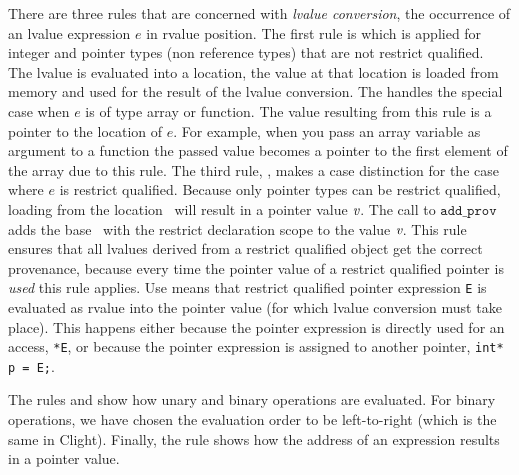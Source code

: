 There are three rules that are concerned with \textit{lvalue conversion}, the occurrence of an lvalue expression $e$
in rvalue position.
The first rule is  which is applied for integer and pointer types (\ie non reference types) that are not restrict qualified.
The lvalue is evaluated into a location, the value at that location is loaded from memory and used for the result of the lvalue conversion. 
The  handles the special case when $e$ is of type array or function.
The value resulting from this rule is a pointer to the location of $e$.
For example, when you pass an array variable as argument to a function the passed value becomes a pointer to
the first element of the array due to this rule.
The third rule, , makes a case distinction for the case where $e$ is restrict qualified.
Because only pointer types can be restrict qualified, loading from the location \Locvar \ will result in a pointer value $\textit{v}$.
The call to $\mathtt{add\_prov}$ adds the base \Locvar \ with the restrict declaration scope to the value $\textit{v}$.
This rule ensures that all lvalues derived from a restrict qualified object get the correct provenance,
because every time the pointer value of a restrict qualified pointer is \textit{used} this rule applies.
Use means that restrict qualified pointer expression \texttt{E} is evaluated as rvalue into the pointer value
(for which lvalue conversion must take place).
This happens either because the pointer expression is directly used for an access, \eg \texttt{*E},
or because the pointer expression is assigned to another pointer, \eg \texttt{int* p = E;}.  

The rules  and  show how unary and binary operations are evaluated.
For binary operations, we have chosen the evaluation order to be left-to-right (which is the same in Clight).
Finally, the rule  shows how the address of an expression results in a pointer value.

